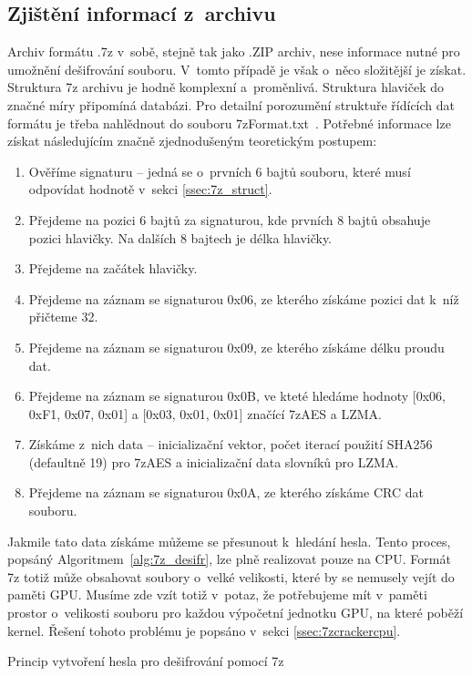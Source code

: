 \subsection{Zjištění informací z~archivu}
Archiv formátu .7z v~sobě, stejně tak jako .ZIP archiv, nese informace nutné pro umožnění
dešifrování souboru. V~tomto případě je však o~něco složitější je získat. Struktura 7z archivu
je hodně komplexní a~proměnlivá. Struktura hlaviček do značné míry připomíná databázi. Pro
detailní porozumění struktuře řídících dat formátu je třeba nahlědnout do souboru
7zFormat.txt~\cite{Pavlov:2010}. Potřebné informace lze získat následujícím značně zjednodušeným
teoretickým postupem:
\begin{enumerate}
    \item Ověříme signaturu -- jedná se o~prvních 6 bajtů souboru, které musí odpovídat hodnotě
v~sekci \ref{ssec:7z_struct}. 
    \item Přejdeme na pozici 6 bajtů za signaturou, kde	prvních 8 bajtů obsahuje pozici hlavičky.
	Na dalších 8 bajtech je délka hlavičky.
    \item Přejdeme na začátek hlavičky.
    \item Přejdeme na záznam se signaturou 0x06, ze kterého získáme pozici dat k~níž přičteme 32.
    \item Přejdeme na záznam se signaturou 0x09, ze kterého získáme délku proudu dat.
    \item Přejdeme na záznam se signaturou 0x0B, ve kteté hledáme hodnoty [0x06, 0xF1, 0x07, 0x01]
	a [0x03, 0x01, 0x01] značící 7zAES a LZMA.
    \item Získáme z~nich data -- inicializační vektor, počet iterací použití SHA256 (defaultně
	19) pro 7zAES a inicializační data slovníků pro LZMA.
    \item Přejdeme na záznam se signaturou 0x0A, ze kterého získáme CRC dat souboru.
\end{enumerate}
Jakmile tato data získáme můžeme se přesunout k~hledání hesla. Tento proces, popsáný
Algoritmem~\ref{alg:7z_desifr}, lze plně realizovat pouze na CPU. Formát 7z totiž může obsahovat
soubory o~velké velikosti, které by se nemusely vejít do paměti GPU. Musíme zde vzít totiž
v~potaz, že potřebujeme mít v~paměti prostor o~velikosti souboru pro každou výpočetní jednotku GPU,
na které poběží kernel. Řešení tohoto problému je popsáno v~sekci \ref{ssec:7zcrackercpu}.

\begin{algorithm}[ht]
    \SetStartEndCondition{ (}{)}{)}\SetAlgoBlockMarkers{}{}%
    \AlgoDisplayBlockMarkers\SetAlgoNoLine%
    \DontPrintSemicolon
    \caption{Princip vytvoření hesla pro dešifrování pomocí 7z}\label{alg:7z_desifr}
\end{algorithm}
    
